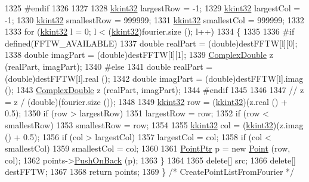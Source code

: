 \begin{DoxyCode}
1325 \textcolor{preprocessor}{  #endif}
1326 
1327 
1328   \hyperlink{namespace_k_k_b_a8fa4952cc84fda1de4bec1fbdd8d5b1b}{kkint32}  largestRow  = -1;
1329   \hyperlink{namespace_k_k_b_a8fa4952cc84fda1de4bec1fbdd8d5b1b}{kkint32}  largestCol  = -1;
1330   \hyperlink{namespace_k_k_b_a8fa4952cc84fda1de4bec1fbdd8d5b1b}{kkint32}  smallestRow = 999999;
1331   \hyperlink{namespace_k_k_b_a8fa4952cc84fda1de4bec1fbdd8d5b1b}{kkint32}  smallestCol = 999999;
1332 
1333   \textcolor{keywordflow}{for}  (\hyperlink{namespace_k_k_b_a8fa4952cc84fda1de4bec1fbdd8d5b1b}{kkint32}  l = 0;  l < (\hyperlink{namespace_k_k_b_a8fa4952cc84fda1de4bec1fbdd8d5b1b}{kkint32})fourier.size ();  l++)
1334   \{
1335 
1336 \textcolor{preprocessor}{    #if  defined(FFTW\_AVAILABLE)}
1337        \textcolor{keywordtype}{double}  realPart = (double)destFFTW[l][0];
1338        \textcolor{keywordtype}{double}  imagPart = (double)destFFTW[l][1];
1339        \hyperlink{namespace_k_k_b_a307e28915a31eb2034af6cb1d0d5fb88}{ComplexDouble}  z (realPart, imagPart);
1340 \textcolor{preprocessor}{    #else}
1341        \textcolor{keywordtype}{double}  realPart = (double)destFFTW[l].real ();
1342        \textcolor{keywordtype}{double}  imagPart = (double)destFFTW[l].imag ();
1343        \hyperlink{namespace_k_k_b_a307e28915a31eb2034af6cb1d0d5fb88}{ComplexDouble}  z (realPart, imagPart);
1344 \textcolor{preprocessor}{    #endif}
1345 
1346     
1347     \textcolor{comment}{//  z = z / (double)(fourier.size ());}
1348 
1349     \hyperlink{namespace_k_k_b_a8fa4952cc84fda1de4bec1fbdd8d5b1b}{kkint32}  row = (\hyperlink{namespace_k_k_b_a8fa4952cc84fda1de4bec1fbdd8d5b1b}{kkint32})(z.real () + 0.5);
1350     \textcolor{keywordflow}{if}  (row > largestRow)
1351       largestRow = row;
1352     \textcolor{keywordflow}{if}  (row < smallestRow)
1353       smallestRow = row;
1354 
1355     \hyperlink{namespace_k_k_b_a8fa4952cc84fda1de4bec1fbdd8d5b1b}{kkint32}  col = (\hyperlink{namespace_k_k_b_a8fa4952cc84fda1de4bec1fbdd8d5b1b}{kkint32})(z.imag () + 0.5);
1356     \textcolor{keywordflow}{if}  (col > largestCol)
1357       largestCol = col;
1358     \textcolor{keywordflow}{if}  (col < smallestCol)
1359       smallestCol = col;
1360 
1361     \hyperlink{class_k_k_b_1_1_point}{PointPtr} p = \textcolor{keyword}{new} \hyperlink{class_k_k_b_1_1_point}{Point} (row, col);
1362     points->\hyperlink{class_k_k_b_1_1_k_k_queue_aa9fba4632b54268bf71ecb42dee0b575}{PushOnBack} (p);
1363   \}
1364 
1365   \textcolor{keyword}{delete}[]  src;
1366   \textcolor{keyword}{delete}[]  destFFTW;
1367 
1368   \textcolor{keywordflow}{return}  points;
1369 \}  \textcolor{comment}{/* CreatePointListFromFourier */}
\end{DoxyCode}
